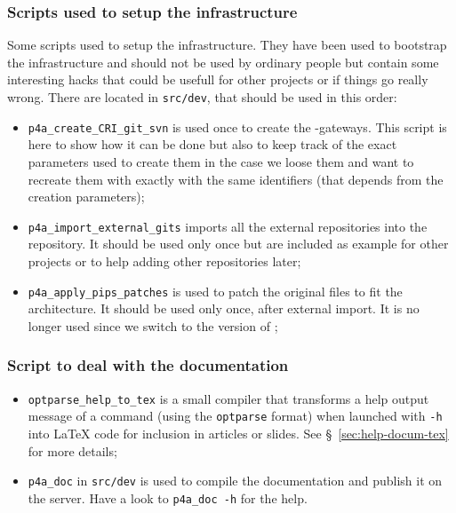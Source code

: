 \documentclass[a4paper]{article}
\begin{document}
\subsubsection{Scripts used to setup the infrastructure}
\label{sec:scripts-used-setup}

Some scripts used to setup the infrastructure. They have been used to
bootstrap the \Apfa infrastructure and should not be used by ordinary
people but contain some interesting hacks that could be usefull for other
projects or if things go really wrong. There are located in
\texttt{src/dev}, that should be used in this order:
\begin{itemize}
\item \verb/p4a_create_CRI_git_svn/ is used once to create the \Apips{}
  \Asvn-\Agit gateways. This script is here to show how it can be done but
  also to keep track of the exact parameters used to create them in the
  case we loose them and want to recreate them with exactly with the same
  identifiers (that depends from the creation parameters);
\item \verb/p4a_import_external_gits/ imports all the external \Agit
  repositories into the \Apfa{} \Agit repository. It should be used only
  once but are included as example for other projects or to help adding
  other repositories later;
\item \verb/p4a_apply_pips_patches/ is used to patch the original \Apips
  files to fit the \Apfa architecture. It should be used only once, after
  external \Agit import. It is no longer used since we switch to the
  \Aautotools version of \Apips;
\end{itemize}


\subsubsection{Script to deal with the documentation}
\label{sec:script-deal-with}

\begin{itemize}
\item \verb|optparse_help_to_tex| is a small compiler that transforms a
  help output message of a command (using the \texttt{optparse} format)
  when launched with \texttt{-h} into La\TeX{} code for inclusion in
  articles or slides. See \S~\ref{sec:help-docum-tex} for more details;
\item \verb|p4a_doc| in \verb|src/dev| is used to compile the \Apfa
  documentation and publish it on the server. Have a look to
  \texttt{p4a\_doc -h} for the help.
\end{itemize}
\end{document}
